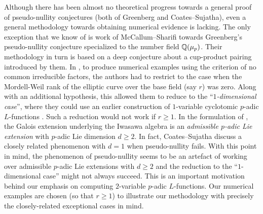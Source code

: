 \documentclass[a4paper,11pt]{article}
\numberwithin{equation}{section}
\begin{document}
Although there has been almost no theoretical progress towards a general proof of pseudo-nullity conjectures (both of Greenberg and Coates--Sujatha), even a general methodology towards obtaining numerical evidence is lacking. The only exception that we know of is work of McCallum--Sharifi \cite{MR2019977} towards Greenberg's pseudo-nullity conjecture specialized to the number field $\mathbb{Q}(\mu_p)$. Their methodology in turn is based on a deep conjecture about a cup-product pairing introduced by them.  In \cite{lei2018codimension}, to produce numerical examples using the criterion of no common irreducible factors, the authors had to restrict to the case when the Mordell-Weil rank of the elliptic curve over the base field (say $r$) was zero. Along with an additional hypothesis, this allowed them to reduce to the ``\textit{$1$-dimensional case}'', where they could use an earlier construction of $1$-variable cyclotomic $p$-adic $L$-functions \cite{PS11}. Such a reduction would not work if $r \geq 1$. In the formulation of \cite[Conjecture B]{MR2148798}, the Galois extension underlying the Iwasawa algebra is an \textit{admissible $p$-adic Lie extension} with $p$-adic Lie dimension $d \geq 2$. In fact, Coates--Sujatha discuss a closely related phenomenon with $d=1$ when pseudo-nullity fails. With this point in mind, the phenomenon of pseudo-nullity seems to be an artefact of working over admissible $p$-adic Lie extensions with $d \geq 2$ and the reduction to the ``$1$-dimensional case'' might not always succeed. This is an important motivation behind our emphasis on computing $2$-variable $p$-adic $L$-functions. Our numerical examples are chosen (so that $r \geq 1$) to illustrate our methodology with precisely the closely-related exceptional cases in mind.
\end{document}
